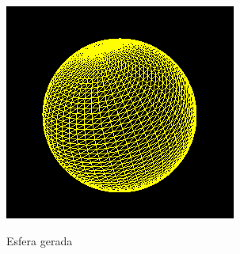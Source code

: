 \begin{center}
 	
 	\includegraphics[keepaspectratio]{resources/sphere.png}
 	\captionsetup{type=figure, width=0.8\linewidth}
	\caption{Esfera gerada}
\label{fig:ssec1:res:sphere} 
\end{center}
\newpage

